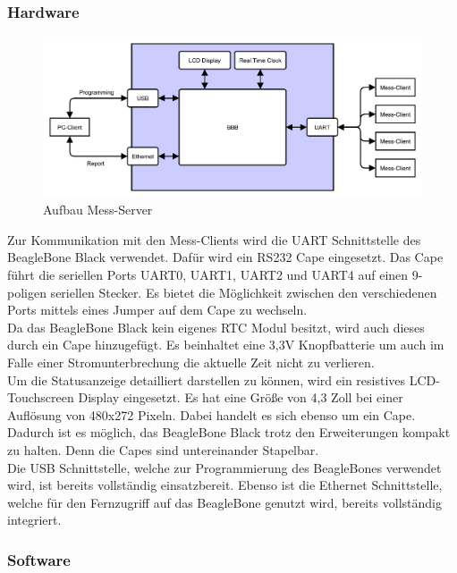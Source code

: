 \subsubsection{Hardware}


\begin{figure}[H]
\begin{center}
\includegraphics[width=\textwidth ]{img/general/UebersichtMaster.pdf}
\caption{Aufbau Mess-Server}
\label{figure_AufbauBleagleBone}
\end{center}
\end{figure}

Zur Kommunikation mit den Mess-Clients wird die \ac{UART} Schnittstelle des BeagleBone Black verwendet. Dafür wird ein RS232 Cape eingesetzt. Das Cape führt die seriellen Ports UART0, UART1, UART2 und UART4 auf einen 9-poligen seriellen Stecker. Es bietet die Möglichkeit zwischen den verschiedenen Ports mittels eines Jumper auf dem Cape zu wechseln.\\
Da das BeagleBone Black kein eigenes \ac{RTC} Modul besitzt, wird auch dieses durch ein Cape hinzugefügt. Es beinhaltet eine 3,3V Knopfbatterie um auch im Falle einer Stromunterbrechung die aktuelle Zeit nicht zu verlieren.\\
Um die Statusanzeige detailliert darstellen zu können, wird ein resistives LCD-Touchscreen Display eingesetzt. Es hat eine Größe von 4,3 Zoll bei einer Auflösung von 480x272 Pixeln. Dabei handelt es sich ebenso um ein Cape. Dadurch ist es möglich, das BeagleBone Black trotz den Erweiterungen kompakt zu halten. Denn die Capes sind untereinander Stapelbar.\\
Die USB Schnittstelle, welche zur Programmierung des BeagleBones verwendet wird, ist bereits vollständig einsatzbereit. Ebenso ist die Ethernet Schnittstelle, welche für den Fernzugriff auf das BeagleBone genutzt wird, bereits vollständig integriert.

\subsubsection{Software}

